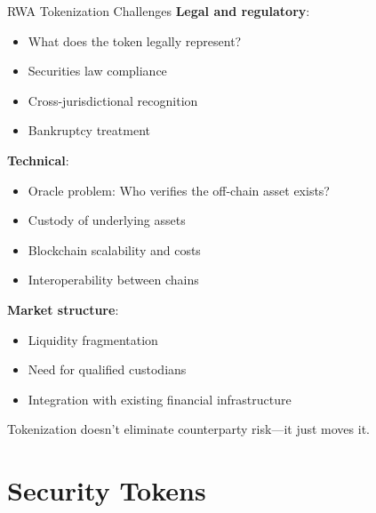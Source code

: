 \documentclass[10pt]{beamer}
\begin{document}
\begin{frame}{RWA Tokenization Challenges}
  \textbf{Legal and regulatory}:
  \begin{itemize}
    \item What does the token legally represent?
    \item Securities law compliance
    \item Cross-jurisdictional recognition
    \item Bankruptcy treatment
  \end{itemize}
  
  \vspace{0.5em}
  \textbf{Technical}:
  \begin{itemize}
    \item Oracle problem: Who verifies the off-chain asset exists?
    \item Custody of underlying assets
    \item Blockchain scalability and costs
    \item Interoperability between chains
  \end{itemize}
  
  \vspace{0.5em}
  \textbf{Market structure}:
  \begin{itemize}
    \item Liquidity fragmentation
    \item Need for qualified custodians
    \item Integration with existing financial infrastructure
  \end{itemize}
  
  \vspace{0.5em}
  Tokenization doesn't eliminate counterparty risk---it just moves it.
\end{frame}

\section{Security Tokens}
\end{document}
